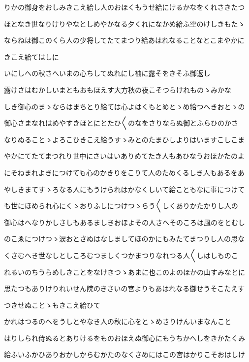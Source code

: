\documentclass[a4paper,11pt,landscape]{ltjtarticle}
\begin{document}
りかの御身をおしみきこえ給し人のおほくもうせ給にけるかなをくれさきたつ
\par\medskip
ほとなき世なりけりやなとしめやかなる夕くれになかめ給ふ空のけしきもたゝ
\par\medskip
ならねは御このくら人の少将してたてまつり給あはれなることなとこまやかに
\par\medskip
きこえ給てはしに
\par\medskip
いにしへの秋さへいまの心ちしてぬれにし袖に露そをきそふ御返し
\par\medskip
露けさはむかしいまともおもほえす大方秋の夜こそつらけれものゝみかな
\par\medskip
しき御心のまゝならはまちとり給ては心よはくもとめとゝめ給つへきおとゝの
\par\medskip
御心さまなれはめやすきほとにとたひ〱のなをさりならぬ御とふらひのかさ
\par\medskip
なりぬることゝよろこひきこえ給うすゝみとのたまひしよりはいますこしこま
\par\medskip
やかにてたてまつれり世中にさいはいありめてたき人もあひなうおほかたのよ
\par\medskip
にそねまれよきにつけても心のかきりをこりて人のためくるしき人もあるをあ
\par\medskip
やしきまてすゝろなる人にもうけられはかなくしいて給こともなに事につけて
\par\medskip
も世にほめられ心にくゝおりふしにつけつゝらう〱しくありかたかりし人の
\par\medskip
御心はへなりかしさしもあるましきおほよその人さへそのころは風のをとむし
\par\medskip
のこゑにつけつゝ涙おとさぬはなしましてほのかにもみたてまつりし人の思な
\par\medskip
くさむへき世なしとしころむつましくつかまつりなれつる人〱しはしものこ
\par\medskip
れるいのちうらめしきことをなけきつゝあまに也このよのほかの山すみなとに
\par\medskip
思たつもありけりれいせん院のきさいの宮よりもあはれなる御せうそこたえす
\par\medskip
つきせぬことゝもきこえ給ひて
\par\medskip
かれはつるのへをうしとやなき人の秋に心をとゝめさりけんいまなんこと
\par\medskip
はりしられ侍ぬるとありけるをものおほえぬ御心にもうちかへしをきかたくみ
\par\medskip
給ふいふかひありおかしからむかたのなくさめにはこの宮はかりこそおはしけ
\par\medskip
\end{document}
